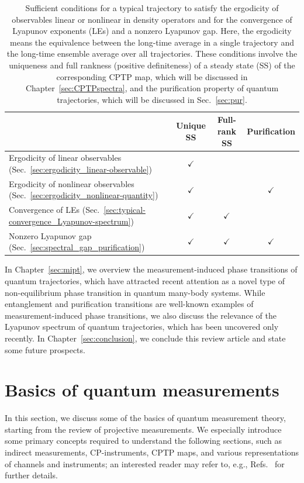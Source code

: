 \documentclass[preprint,pteplogo]{ptephy_v2}%
\numberwithin{equation}{section}
\theoremstyle{definition}
\begin{document}
\begin{table}
\begin{center}
\begin{tabular}{l|ccc}
\hline \hline
 & Unique SS & Full-rank SS & Purification \\
\hline
Ergodicity of linear observables (Sec.~\ref{sec:ergodicity_linear-observable}) & $\checkmark$ && \\
Ergodicity of nonlinear observables (Sec.~\ref{sec:ergodicity_nonlinear-quantity}) & $\checkmark$ & & $\checkmark$ \\
Convergence of LEs (Sec.~\ref{sec:typical-convergence_Lyapunov-spectrum}) & $\checkmark$ & $\checkmark$ & \\
Nonzero Lyapunov gap (Sec.~\ref{sec:spectral_gap_purification}) & $\checkmark$ & $\checkmark$ & $\checkmark$ \\
\hline \hline
\end{tabular}
\caption{
\label{tab:ergodicity}
Sufficient conditions for a typical trajectory to satisfy the ergodicity of observables linear or nonlinear in density operators and for the convergence of Lyapunov exponents (LEs) and a nonzero Lyapunov gap.
Here, the ergodicity means the equivalence between the long-time average in a single trajectory and the long-time ensemble average over all trajectories.
These conditions involve the uniqueness and full rankness (positive definiteness) of a steady state (SS) of the corresponding CPTP map, which will be discussed in Chapter~\ref{sec:CPTPspectra}, and the purification property of quantum trajectories, which will be discussed in Sec.~\ref{sec:pur}.
}
\end{center}
\end{table}

In Chapter~\ref{sec:mipt}, we overview the measurement-induced phase transitions of quantum trajectories, which have attracted recent attention as a novel type of non-equilibrium phase transition in quantum many-body systems.
While entanglement and purification transitions are well-known examples of measurement-induced phase transitions, we also discuss the relevance of the Lyapunov spectrum of quantum trajectories, which has been uncovered only recently.
In Chapter~\ref{sec:conclusion}, we conclude this review article and state some future prospects.


\section{Basics of quantum measurements}\label{sec:quantum-measurement}
In this section, we discuss some of the basics of quantum measurement theory, starting from the review of projective measurements.
We especially introduce some primary concepts required to understand the following sections, such as indirect measurements, CP-instruments, CPTP maps, and various representations of channels and instruments; an interested reader may refer to, e.g., Refs.~\cite{wiseman2009quantum, wolf2012quantum} for further details.
\end{document}
